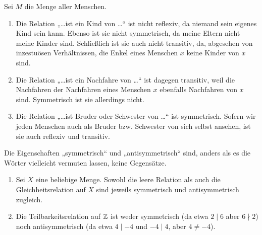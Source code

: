 \begin{bsp}
    Sei $M$ die Menge aller Menschen.
    \begin{enumerate}
        \item Die Relation „\dots ist ein Kind von \dots“ ist nicht reflexiv, da niemand sein eigenes Kind sein kann. Ebenso ist sie nicht symmetrisch, da meine Eltern nicht meine Kinder sind. Schließlich ist sie auch nicht transitiv, da, abgesehen von inzestuösen Verhältnissen, die Enkel eines Menschen $x$ keine Kinder von $x$ sind.
        \item Die Relation „\dots ist ein Nachfahre von \dots“ ist dagegen transitiv, weil die Nachfahren der Nachfahren eines Menschen $x$ ebenfalls Nachfahren von $x$ sind. Symmetrisch ist sie allerdings nicht.
        \item Die Relation „\dots ist Bruder oder Schwester von \dots“ ist symmetrisch. Sofern wir jeden Menschen auch als Bruder bzw. Schwester von sich selbst ansehen, ist sie auch reflexiv und transitiv.
    \end{enumerate}
\end{bsp}


\begin{bsp}
    Die Eigenschaften „symmetrisch“ und „antisymmetrisch“ sind, anders als es die Wörter vielleicht vermuten lassen, keine Gegensätze.
    \begin{enumerate}
        \item Sei $X$ eine beliebige Menge. Sowohl die leere Relation als auch die Gleichheitsrelation auf $X$ sind jeweils symmetrisch und antisymmetrisch zugleich.
        \item Die Teilbarkeitsrelation auf $\mathbb Z$ ist weder symmetrisch (da etwa $2\mid 6$ aber $6\nmid 2$) noch antisymmetrisch (da etwa $4\mid -4$ und $-4\mid 4$, aber $4\neq -4$).
    \end{enumerate}
\end{bsp}


